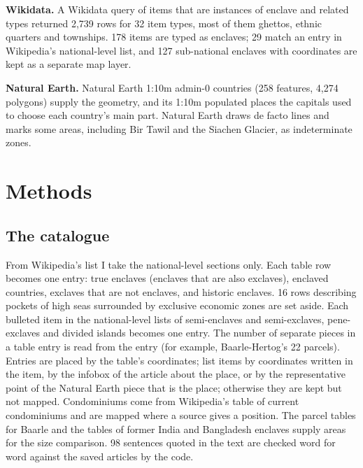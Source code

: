 \documentclass[11pt,a4paper]{article}
\begin{document}
\textbf{Wikidata.} A Wikidata query of items that are instances of enclave and related types returned 2,739 rows for 32 item types, most of them ghettos, ethnic quarters and townships. 178 items are typed as enclaves; 29 match an entry in Wikipedia's national-level list, and 127 sub-national enclaves with coordinates are kept as a separate map layer.

\textbf{Natural Earth.} Natural Earth 1:10m admin-0 countries (258 features, 4,274 polygons) supply the geometry, and its 1:10m populated places the capitals used to choose each country's main part. Natural Earth draws de facto lines and marks some areas, including Bir Tawil and the Siachen Glacier, as indeterminate zones.

\section{Methods}
\subsection{The catalogue}
From Wikipedia's list I take the national-level sections only. Each table row becomes one entry: true enclaves (enclaves that are also exclaves), enclaved countries, exclaves that are not enclaves, and historic enclaves. 16 rows describing pockets of high seas surrounded by exclusive economic zones are set aside. Each bulleted item in the national-level lists of semi-enclaves and semi-exclaves, pene-exclaves and divided islands becomes one entry. The number of separate pieces in a table entry is read from the entry (for example, Baarle-Hertog's 22 parcels). Entries are placed by the table's coordinates; list items by coordinates written in the item, by the infobox of the article about the place, or by the representative point of the Natural Earth piece that is the place; otherwise they are kept but not mapped. Condominiums come from Wikipedia's table of current condominiums and are mapped where a source gives a position. The parcel tables for Baarle and the tables of former India and Bangladesh enclaves supply areas for the size comparison. 98 sentences quoted in the text are checked word for word against the saved articles by the code.
\end{document}
